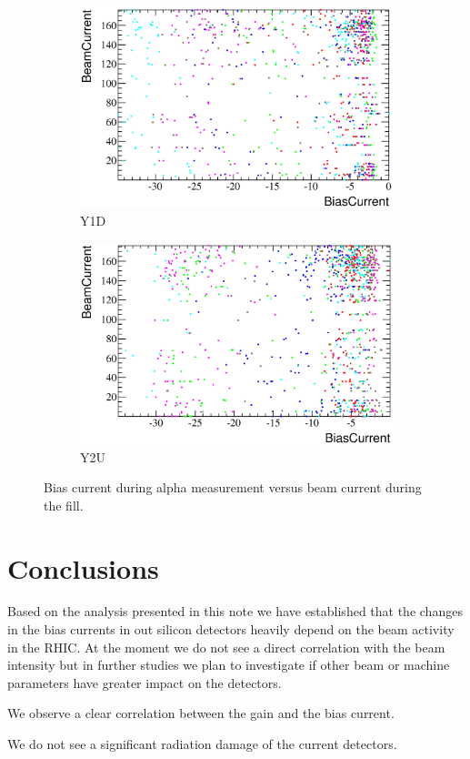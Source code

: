 \documentclass[a4paper]{article}
\begin{document}
\begin{figure}[p]
\begin{subfigure}[b]{0.5\textwidth}
\includegraphics[width=\textwidth]{gfx/run13_alpha_study/Y1D/c_hBiasCurrent_BeamCurrent.eps}
\caption{Y1D}
\end{subfigure}
\begin{subfigure}[b]{0.5\textwidth}
\includegraphics[width=\textwidth]{gfx/run13_alpha_study/Y2U/c_hBiasCurrent_BeamCurrent.eps}
\caption{Y2U}
\end{subfigure}
\caption{Bias current during alpha measurement versus beam current during the fill.}
\end{figure}


\section{Conclusions}

Based on the analysis presented in this note we have established that the
changes in the bias currents in out silicon detectors heavily depend on the beam
activity in the RHIC. At the moment we do not see a direct correlation with the
beam intensity but in further studies we plan to investigate if other beam or
machine parameters have greater impact on the detectors.

We observe a clear correlation between the gain and the bias current.

We do not see a significant radiation damage of the current detectors.
\end{document}
